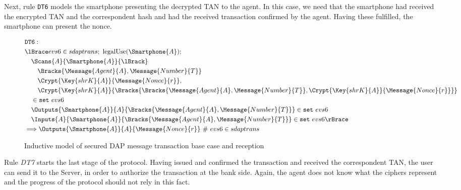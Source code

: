 Next, rule \texttt{DT6} models the smartphone presenting the decrypted TAN to the agent. In this case, we need that the smartphone had received the encrypted TAN and the correspondent hash and had the received transaction confirmed by the agent. Having these fulfilled, the smartphone can present the nonce.

\begin{figure}[!h]
  \begin{align*}
    & \texttt{DT6}: \newline \\
    & \lBrace evs6 \in sdaptrans;\ \text{legalUse}(\Smartphone{A}); \\
    & \quad \Scans{A}{\Smartphone{A}}{\lBrack} \\
    & \qquad \Bracks{\Message{Agent}{A}, \Message{Number}{T}} \\
    & \qquad \Crypt{\Key{shrK}{A}}{\Message{Nonce}{r}}, \\
    & \qquad \Crypt{\Key{shrK}{A}}{\Bracks{\Bracks{\Message{Agent}{A}, \Message{Number}{T}}, \Crypt{\Key{shrK}{A}}{\Message{Nonce}{r}}}} \\
    & \quad \in \texttt{set} \ evs6 \\
    & \quad \Outputs{\Smartphone{A}}{A}{\Bracks{\Message{Agent}{A}, \Message{Number}{T}}} \in \texttt{set} \ evs6 \\
    & \quad \Inputs{A}{\Smartphone{A}}{\Bracks{\Message{Agent}{A}, \Message{Number}{T}}} \in \texttt{set} \ evs6 \rBrace \\ 
    & \Longrightarrow \Outputs{\Smartphone{A}}{A}{\Message{Nonce}{r}} \ \# \ evs6 \in sdaptrans
  \end{align*}
  \label{fig:dap-model-6}
  \caption{Inductive model of secured DAP message transaction base case and reception}
\end{figure}

Rule \textit{DT7} starts the last stage of the protocol. Having issued and confirmed the transaction and received the correspondent TAN, the user can send it to the Server, in order to authorize the transaction at the bank side. Again, the agent does not know what the ciphers represent and the progress of the protocol should not rely in this fact.

